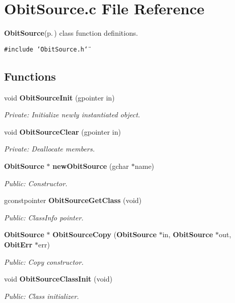 \section{Obit\-Source.c File Reference}
\label{ObitSource_8c}
{\bf Obit\-Source}{\rm (p.\,\pageref{structObitSource})} class function definitions. 

{\tt \#include \char`\"{}Obit\-Source.h\char`\"{}}\par
\subsection*{Functions}
\begin{CompactItemize}
\item 
void {\bf Obit\-Source\-Init} (gpointer in)
\begin{CompactList}\small\item\em Private: Initialize newly instantiated object. \item\end{CompactList}\item 
void {\bf Obit\-Source\-Clear} (gpointer in)
\begin{CompactList}\small\item\em Private: Deallocate members. \item\end{CompactList}\item 
{\bf Obit\-Source} $\ast$ {\bf new\-Obit\-Source} (gchar $\ast$name)
\begin{CompactList}\small\item\em Public: Constructor. \item\end{CompactList}\item 
gconstpointer {\bf Obit\-Source\-Get\-Class} (void)
\begin{CompactList}\small\item\em Public: Class\-Info pointer. \item\end{CompactList}\item 
{\bf Obit\-Source} $\ast$ {\bf Obit\-Source\-Copy} ({\bf Obit\-Source} $\ast$in, {\bf Obit\-Source} $\ast$out, {\bf Obit\-Err} $\ast$err)
\begin{CompactList}\small\item\em Public: Copy constructor. \item\end{CompactList}\item 
void {\bf Obit\-Source\-Class\-Init} (void)
\begin{CompactList}\small\item\em Public: Class initializer. \item\end{CompactList}\end{CompactItemize}


